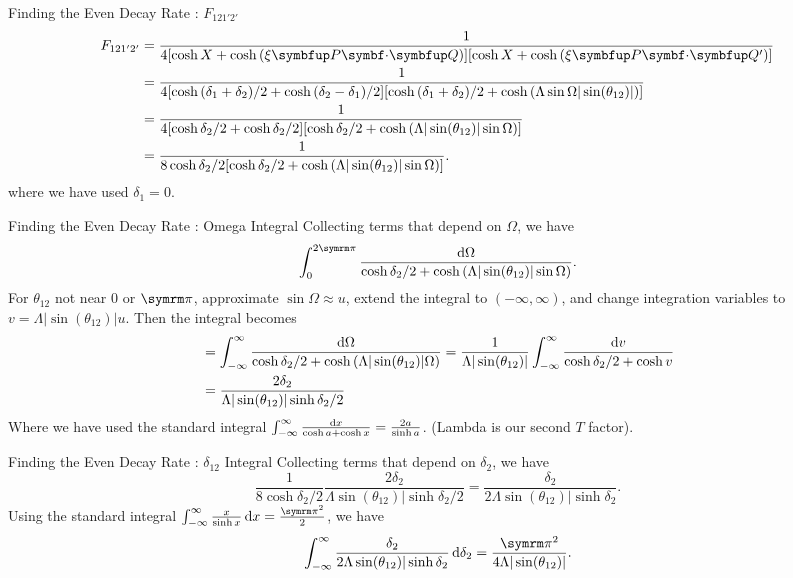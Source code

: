 \begin{frame}{Finding the Even Decay Rate : \alert{\(F_{121'2'}\)}}
  \begin{align}
    F_{121'2'} & = \frac{1}{4[\cosh{X}+\cosh{(\xi\vv{P}\vdot\vv{Q})}][\cosh{X}+\cosh{(\xi\vv{P}\vdot\vv{Q'})}]}                                                                 \\
               & = \frac{1}{4[\cosh{(\delta_1+\delta_2)/2}+\cosh{(\delta_2-\delta_1)/2}][\cosh{(\delta_1+\delta_2)/2}+\cosh{(\Lambda\sin\Omega|\sin(\theta_{12})|})]} \nonumber \\
               & = \frac{1}{4[\cosh{\delta_2/2}+\cosh{\delta_2/2}][\cosh{\delta_2/2}+\cosh{(\Lambda|\sin(\theta_{12})|\sin\Omega})]}                                            \\
               & = \frac{1}{8\cosh{\delta_2/2}[\cosh{\delta_2/2}+\cosh{(\Lambda|\sin(\theta_{12})|\sin\Omega})]}.
  \end{align}
  where we have used \(\delta_1=0\).
\end{frame}

\begin{frame}{Finding the Even Decay Rate : \alert{Omega Integral}}
  Collecting terms that depend on \(\Omega\), we have
  \begin{equation}
    \int_0^{2\cpi} \frac{\odif{\Omega}}{\cosh{\delta_2/2}+\cosh{(\Lambda|\sin(\theta_{12})|\sin\Omega})}.
  \end{equation}
  For \(\theta_{12}\) not near \(0\) or \(\cpi\), approximate \(\sin\Omega \approx u\), extend the integral to \((-\infty, \infty)\), and change integration variables to \(v=\Lambda|\sin(\theta_{12})|u\). Then the integral becomes
  \begin{align}
     & = \int_{-\infty}^{\infty} \frac{\odif{\Omega}}{\cosh{\delta_2/2}+\cosh{(\Lambda|\sin(\theta_{12})|\Omega})}
    = \frac{1}{\Lambda|\sin(\theta_{12})|} \int_{-\infty}^{\infty}  \frac{\odif{v}}{\cosh{\delta_2/2}+\cosh{v}}    \\
     & = \frac{2\delta_2}{\Lambda|\sin(\theta_{12})|\sinh{\delta_2/2}}
  \end{align}
  Where we have used the standard integral \(\int_{-\infty}^{\infty} \frac{\odif{x}}{\cosh{a}+\cosh{x}} = \frac{2a}{\sinh{a}}\). (\alert{Lambda is our second \(T\) factor}).
\end{frame}

\begin{frame}{Finding the Even Decay Rate : \alert{\(\delta_{12}\) Integral}}
  Collecting terms that depend on \(\delta_2\), we have
  \begin{equation}
    \frac{1}{8\cosh{\delta_2/2}} \frac{2\delta_2}{\Lambda\sin(\theta_{12})|\sinh{\delta_2/2}} = \frac{\delta_2}{2\Lambda\sin(\theta_{12})|\sinh{\delta_2}}.
  \end{equation}
  Using the standard integral \(\int_{-\infty}^{\infty} \frac{x}{\sinh{x}} \odif{x} = \frac{\cpi^2}{2}\), we have
  \begin{equation}
    \int_{-\infty}^{\infty} \frac{\delta_2}{2\Lambda\sin(\theta_{12})|\sinh{\delta_2}} \odif{\delta_2} = \frac{\cpi^2}{4\Lambda|\sin(\theta_{12})|}.
  \end{equation}
\end{frame}

